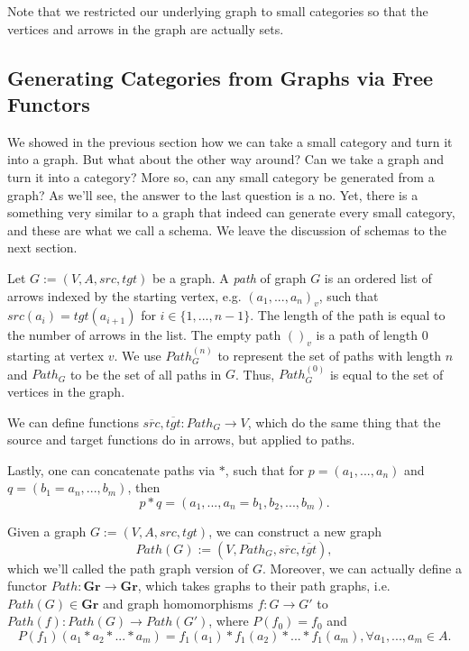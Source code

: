 Note that we restricted our underlying graph to small categories so that
the vertices and arrows in the graph are actually sets.

\subsection{Generating Categories from Graphs via Free Functors}

We showed in the previous section how we can take a small category and turn it
into a graph. But what about the other way around? Can we take a graph and turn it
into a category? More so, can any small category be generated from a graph?
As we'll see, the answer to the last question is a no. Yet, there is a
something very similar to a graph that indeed can generate every small category,
and these are what we call a schema. We leave the discussion of schemas to the next section.

\begin{definition}
  Let $G:=(V, A, src, tgt)$ be a graph. A \textit{path} of graph $G$
  is an ordered list of arrows indexed by the starting vertex, e.g. $(a_1,..., a_n)_v$,
  such that $src(a_i) = tgt(a_{i+1})$ for $i \in\{1,...,n-1\}$.
  The length of the path is equal to the
  number of arrows in the list. The empty path $()_v$ is a path of length 0 starting at vertex $v$.
  We use $Path^{(n)}_G$ to represent the set of paths with length $n$
  and $Path_G$ to be the set of all paths in $G$. Thus, $Path^{(0)}_G$ is equal to the set of vertices
  in the graph.

  We can define functions $\overline{src}, \overline{tgt}:Path_G \to V$,
  which do the same thing that the source and target functions do in arrows,
  but applied to paths.

  Lastly, one can concatenate paths via $*$, such that
  for $p = (a_1,...,a_n)$ and $q = (b_1=a_n,...,b_m)$, then
  \begin{displaymath}
    p * q = (a_1,...,a_n=b_1, b_2,...,b_m).
  \end{displaymath}
\end{definition}

\begin{definition}
  Given a graph $G:=(V, A, src, tgt)$, we can construct a new graph
  \begin{displaymath}
    Path(G) := (V, Path_G, \overline{src}, \overline{tgt}),
  \end{displaymath}
  which we'll called the path graph version of $G$.
  Moreover, we can actually define a functor $Path : \mathbf{Gr} \to \mathbf{Gr}$,
  which takes graphs to their path graphs, i.e. $Path(G) \in \mathbf {Gr}$ and
  graph homomorphisms $f:G \to G'$ to $Path(f):Path(G)\to Path(G')$, where
  $P(f_0) = f_0$ and
  \begin{displaymath}
    P(f_1)(a_1*a_2*...*a_m) = f_1(a_1)*f_1(a_2)*...*f_1(a_m), \forall a_1,...,a_m \in A.
  \end{displaymath}
  \label{def:PathFunctor}
\end{definition}

